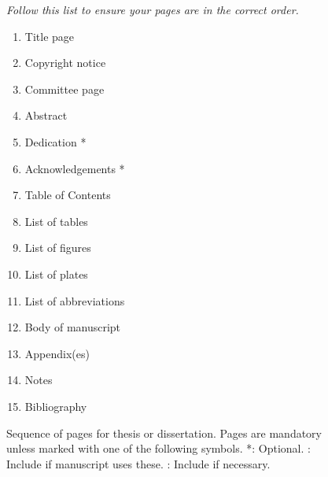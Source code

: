 \begin{figure}[ht]
\textit{Follow this list to ensure your pages are in the correct order.}
    \begin{enumerate}
        \item Title page
        \item Copyright notice
        \item Committee page
        \item Abstract
        \item Dedication *
        \item Acknowledgements *
        \item Table of Contents
        \item List of tables \dag
        \item List of figures \dag
        \item List of plates \dag
        \item List of abbreviations \ddag
        \item Body of manuscript
        \item Appendix(es) \ddag
        \item Notes \ddag
        \item Bibliography
    \end{enumerate}
\caption[Sequence of pages for thesis or dissertation]{Sequence of pages for thesis or dissertation. Pages are mandatory unless marked with one of the following symbols. *: Optional. \dag: Include if manuscript uses these. \ddag: Include if necessary.}
\label{fig:sequence-pages}
\end{figure}